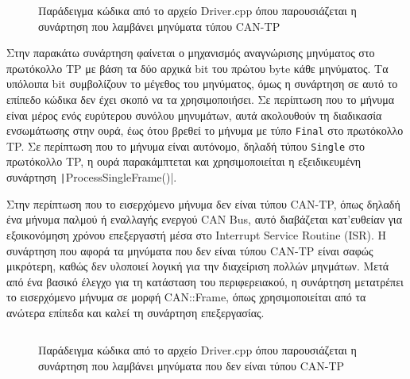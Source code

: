\documentclass[a4paper,nobib,justified]{tufte-book}
\begin{document}
\begin{figure}
	\inputminted{c++}{code/examples/driver-tp-message-receiver.cpp}
	\label{code:driver-tp-message-receiver}
	\caption[Η συνάρτηση που λαμβάνει μηνύματα τύπου CAN-TP]{Παράδειγμα κώδικα από το αρχείο Driver.cpp όπου παρουσιάζεται η συνάρτηση που λαμβάνει μηνύματα τύπου CAN-TP}
\end{figure}
\FloatBarrier

Στην παρακάτω συνάρτηση φαίνεται ο μηχανισμός αναγνώρισης μηνύματος στο πρωτόκολλο TP με βάση τα δύο αρχικά bit του πρώτου byte κάθε μηνύματος. Τα υπόλοιπα bit συμβολίζουν το μέγεθος του μηνύματος, όμως η συνάρτηση σε αυτό το επίπεδο κώδικα δεν έχει σκοπό να τα χρησιμοποιήσει. Σε περίπτωση που το μήνυμα είναι μέρος ενός ευρύτερου συνόλου μηνυμάτων, αυτά ακολουθούν τη διαδικασία ενσωμάτωσης στην ουρά, έως ότου βρεθεί το μήνυμα με τύπο \texttt{Final} στο πρωτόκολλο TP. Σε περίπτωση που το μήνυμα είναι αυτόνομο, δηλαδή τύπου \texttt{Single} στο πρωτόκολλο TP, η ουρά παρακάμπτεται και χρησιμοποιείται η εξειδικευμένη συνάρτηση \texttt|ProcessSingleFrame()|.

Στην περίπτωση που το εισερχόμενο μήνυμα δεν είναι τύπου CAN-TP, όπως δηλαδή ένα μήνυμα παλμού ή εναλλαγής ενεργού CAN Bus, αυτό διαβάζεται κατ'ευθείαν για εξοικονόμηση χρόνου επεξεργαστή μέσα στο Interrupt Service Routine (ISR). Η συνάρτηση που αφορά τα μηνύματα που δεν είναι τύπου CAN-TP είναι σαφώς μικρότερη, καθώς δεν υλοποιεί λογική για την διαχείριση πολλών μηνμάτων. Μετά από ένα βασικό έλεγχο για τη κατάσταση του περιφερειακού, η συνάρτηση μετατρέπει το εισερχόμενο μήνυμα σε μορφή CAN::Frame, όπως χρησιμοποιείται από τα ανώτερα επίπεδα και καλεί τη συνάρτηση επεξεργασίας.

\begin{figure}
	\inputminted{c++}{code/examples/driver-non-tp-receiver.cpp}
	\label{code:driver-non-tp-receiver}
	\caption[Η συνάρτηση που λαμβάνει μηνύματα που δεν είναι τύπου CAN-TP]{Παράδειγμα κώδικα από το αρχείο Driver.cpp όπου παρουσιάζεται η συνάρτηση που λαμβάνει μηνύματα που δεν είναι τύπου CAN-TP}
\end{figure}
\FloatBarrier
\end{document}
